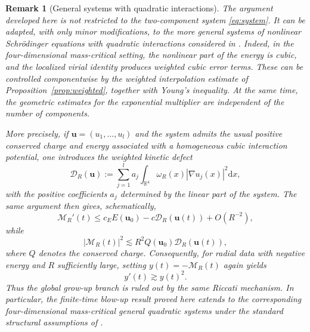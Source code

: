 \documentclass[10pt,a4paper]{amsart}
\numberwithin{equation}{section}
\newtheorem{remark}[theorem]{Remark}
\newcommand{\dd}{\mathrm{d}x}
\begin{document}
\begin{remark}[General systems with quadratic interactions]
The argument developed here is not restricted to the two-component system \eqref{eq:system}. It can be adapted, with only minor modifications, to the more general systems of nonlinear Schr\"odinger equations with quadratic interactions considered in \cite{DF,NP}. Indeed, in the four-dimensional mass-critical setting, the nonlinear part of the energy is cubic, and the localized virial identity produces weighted cubic error terms. These can be controlled componentwise by the weighted interpolation estimate of Proposition~\ref{prop:weighted}, together with Young's inequality. At the same time, the geometric estimates for the exponential multiplier are independent of the number of components.

More precisely, if $\mathbf u=(u_1,\ldots,u_l)$ and the system admits the usual positive conserved charge and energy associated with a homogeneous cubic interaction potential, one introduces the weighted kinetic defect
\[
 \mathcal D_R(\mathbf u) := \sum_{j=1}^l a_j \int_{\mathbb R^4} \omega_R(x)|\nabla u_j(x)|^2\dd,
\]
with the positive coefficients $a_j$ determined by the linear part of the system. The same argument then gives, schematically,
\[
 \mathcal M_R'(t) \le c_E E(\mathbf u_0) -c \mathcal D_R(\mathbf u(t)) +O(R^{-2}),
\]
while
\[
 |\mathcal M_R(t)|^2 \lesssim R^2 Q(\mathbf u_0) \mathcal D_R(\mathbf u(t)),
\]
where $Q$ denotes the conserved charge. Consequently, for radial data with negative energy and $R$ sufficiently large, setting $y(t)=-\mathcal M_R(t)$ again yields
\[
 y'(t)\gtrsim y(t)^2.
\]
Thus the global grow-up branch is ruled out by the same Riccati mechanism. In particular, the finite-time blow-up result proved here extends to the corresponding four-dimensional mass-critical general quadratic systems under the standard structural assumptions of \cite{DF,NP}.
\end{remark}
\end{document}
